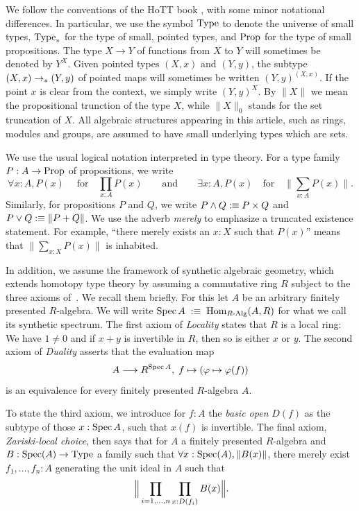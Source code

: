 We follow the conventions of the HoTT book \cite{hott}, with some minor notational differences.
In particular, we use the symbol $\mathrm{Type}$ to denote the universe of small types, $\mathrm{Type}_\ast$ for the type of small, pointed types, and $\mathrm{Prop}$ for the type of small propositions.
The type $X \to Y$ of functions from $X$ to $Y$ will sometimes be denoted by $Y^X$.
Given pointed types $(X,x)$ and $(Y,y)$, the subtype $(X,x) \to_{\ast} (Y,y)$ of pointed maps will sometimes be written $(Y,y)^{(X,x)}$.
If the point $x$ is clear from the context, we simply write $(Y,y)^X$.
By $\|X\|$ we mean the propositional trunction of the type $X$, while $\|X\|_0$ stands for the set truncation of $X$.
All algebraic structures appearing in this article, such as rings, modules and groups, are assumed to have small underlying types which are sets.

We use the usual logical notation interpreted in type theory. For a type family $P:A \to \mathrm{Prop}$ of propositions, we write
\[
  \forall x:A,P(x) \; \quad\text{for}\quad \prod_{x:A} P(x)
  \qquad
  \text{and}
  \qquad
  \exists x:A,P(x) \quad\text{for}\quad \Big\|\sum_{x:A}P(x)\Big\|.
\]
Similarly, for propositions $P$ and $Q$, we write $P\land Q :\equiv P\times Q$ and $P\lor Q :\equiv \|P+Q\|$.
We use the adverb \emph{merely} to emphasize a truncated existence statement.
For example, ``there merely exists an $x:X$ such that $P(x)$'' means that $\|\sum_{x:X}P(x)\|$ is inhabited.
\bigskip

In addition, we assume the framework of synthetic algebraic geometry, which extends homotopy type theory by assuming a commutative ring $R$ subject to the three axioms of~\cite{draft}.
We recall them briefly.
For this let $A$ be an arbitrary finitely presented $R$-algebra.
We will write $\operatorname{Spec} A \;:\equiv\; \mathrm{Hom}_{R\text{-Alg}}(A,R)$ for what we call its synthetic spectrum.
The first axiom of \emph{Locality} states that $R$ is a local ring: We have $1 \neq 0$ and if $x+y$ is invertible in $R$, then so is either $x$ or $y$.
The second axiom of \emph{Duality} asserts that the evaluation map
\[
  A \longrightarrow R^{\operatorname{Spec} A},\;
  f \mapsto (\varphi \mapsto \varphi(f))
\]
is an equivalence for every finitely presented $R$-algebra $A$.

To state the third axiom, we introduce for $f:A$ the \emph{basic open} $D(f)$ as the subtype of those $x:\operatorname{Spec} A$, such that $x(f)$ is invertible.
The final axiom, \emph{Zariski-local choice}, then says that for $A$ a finitely presented $R$-algebra and $B:\operatorname{Spec}(A) \to \mathrm{Type}$ a family such that $\forall x:\operatorname{Spec}(A), \|B(x)\|$, there merely exist $f_1, \hdots, f_n:A$ generating the unit ideal in $A$ such that
\[
  \Big\|
    \prod_{i=1, \hdots, n} \prod_{x:D(f_i)} B(x)
  \Big\| \rlap{.}
\]
